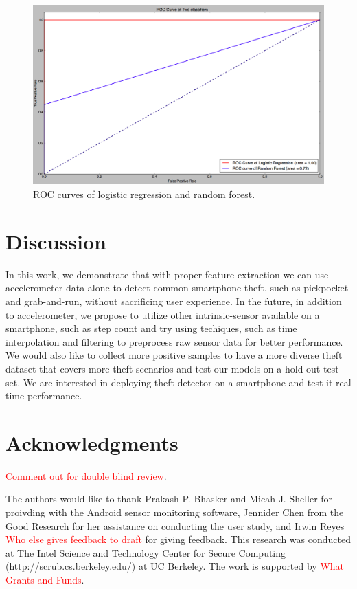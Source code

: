 \documentclass{soups}
\begin{document}
\begin{figure}[H]
\begin{center}
\includegraphics[width=1.0\columnwidth]{roc_curves.png}
\end{center}
\caption{ROC curves of logistic regression and random forest.}
\end{figure}



\section{Discussion}
In this work, we demonstrate that with proper feature extraction we can use accelerometer data alone to detect common smartphone theft, such as pickpocket and grab-and-run, without sacrificing user experience. 
In the future, in addition to accelerometer, we propose to utilize other intrinsic-sensor available on a smartphone, such as step count and try using techiques, such as time interpolation and filtering to preprocess raw sensor data for better performance. 
We would also like to collect more positive samples to have a more diverse theft dataset that covers more theft scenarios and test our models on a hold-out test set. 
We are interested in deploying theft detector on a smartphone and test it real time performance.




\section{Acknowledgments}
\textcolor{red}{Comment out for double blind review}. 

The authors would like to thank Prakash P. Bhasker and Micah J. Sheller for proivding with the Android sensor monitoring software, Jennider Chen from the Good Research for her assistance on conducting the user study, and Irwin Reyes \textcolor{red}{Who else gives feedback to draft} for giving feedback. 
This research was conducted at The Intel Science and Technology Center for Secure Computing (http://scrub.cs.berkeley.edu/) at UC Berkeley. 
The work is supported by \textcolor{red}{What Grants and Funds}. 
\end{document}
